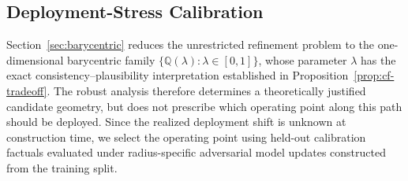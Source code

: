 

\iffalse
\subsection{Deployment-Stress Calibration}
\label{sec:calibration}

Section~\ref{sec:barycentric} reduces the unrestricted refinement problem to the one-dimensional barycentric family $\{\mathbb{Q}(\lambda):\lambda\in[0,1]\}$, whose parameter $\lambda$ has the exact \textcolor{frappe_red}{consistency}--plausibility interpretation established in Proposition~\ref{prop:cf-tradeoff}.
The robust analysis therefore determines a theoretically justified candidate geometry, but does not prescribe which operating point along this path should be deployed.
Since the realized deployment shift is unknown at construction time, we select the operating point using held-out calibration factuals evaluated under radius-specific adversarial model updates constructed from the training split.

